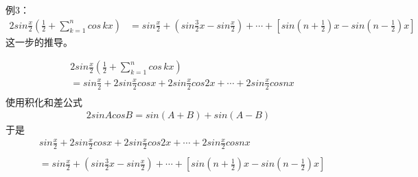 \documentclass{article}
\begin{document}
\begin{zremark}
  例3：
  \begin{align*}
    2sin\frac{x}{2}\left( \frac{1}{2} + \sum\limits_{k=1}^n cos\, kx \right)
     & = sin \frac{x}{2} + \left( sin \frac{3}{2}x - sin \frac{x}{2} \right)
    + \cdots + \left[ sin(n + \frac{1}{2})x - sin(n - \frac{1}{2})x \right]
  \end{align*}
  这一步的推导。
\end{zremark}
\begin{align*}
   & 2sin\frac{x}{2}\left( \frac{1}{2} + \sum\limits_{k=1}^n cos\, kx \right)                           \\
   & = sin \frac{x}{2} + 2sin\frac{x}{2} cos x + 2sin\frac{x}{2}cos 2x + \cdots + 2sin\frac{x}{2}cos nx \\
\end{align*}
使用积化和差公式
\begin{align*}
  2 sin A cos B = sin (A + B) + sin (A - B)
\end{align*}
于是
\begin{align*}
   & sin \frac{x}{2} + 2sin\frac{x}{2} cos x + 2sin\frac{x}{2}cos 2x + \cdots + 2sin\frac{x}{2}cos nx \\                                                                      \\
   & = sin \frac{x}{2} + \left( sin \frac{3}{2}x - sin \frac{x}{2} \right)
  + \cdots + \left[ sin(n + \frac{1}{2})x - sin(n - \frac{1}{2})x \right]
\end{align*}
\end{document}
